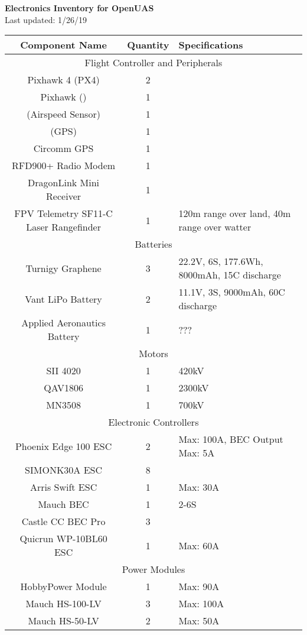 \documentclass[12 pt]{article}
\begin{document}
{\bf Electronics Inventory for OpenUAS} \\

Last updated: 1/26/19 \\

\begin{longtable}{|c|c| p{5cm} |}
\hline 
{\bf Component Name} & {\bf Quantity} & {\bf Specifications} \\ 
\hline
\multicolumn{3}{|c|}{Flight Controller and Peripherals} \\ \hline
Pixhawk 4 (PX4) & 2 & \\ \hline
Pixhawk () & 1 & \\ \hline
(Airspeed Sensor) & 1 & \\ \hline
(GPS) & 1 & \\ \hline
Circomm GPS & 1 & \\ \hline
RFD900+ Radio Modem & 1 & \\ \hline
DragonLink Mini Receiver & 1 & \\ \hline
FPV Telemetry
SF11-C Laser Rangefinder & 1 & 120m range over land, 40m range over watter \\ \hline
\multicolumn{3}{|c|}{Batteries} \\ \hline
Turnigy Graphene & 3 & 22.2V, 6S, 177.6Wh, 8000mAh, 15C discharge \\ \hline
Vant LiPo Battery & 2 & 11.1V, 3S, 9000mAh, 60C discharge \\ \hline
Applied Aeronautics Battery & 1 & ??? \\ \hline
\multicolumn{3}{|c|}{Motors} \\ \hline
SII 4020 & 1 & 420kV \\ \hline
QAV1806 & 1 & 2300kV \\ \hline
MN3508 & 1 & 700kV \\ \hline
\multicolumn{3}{|c|}{Electronic Controllers} \\ \hline
Phoenix Edge 100 ESC & 2 & Max: 100A, BEC Output Max: 5A \\ \hline
SIMONK30A ESC & 8 & \\ \hline
Arris Swift ESC & 1 & Max: 30A \\ \hline
Mauch BEC & 1 & 2-6S \\ \hline
Castle CC BEC Pro & 3 & \\ \hline
Quicrun WP-10BL60 ESC & 1 & Max: 60A \\ \hline
\multicolumn{3}{|c|}{Power Modules} \\ \hline
HobbyPower Module & 1 & Max: 90A \\ \hline
Mauch HS-100-LV & 3 & Max: 100A \\ \hline
Mauch HS-50-LV & 2 & Max: 50A \\ \hline

\end{longtable}
\end{document}
